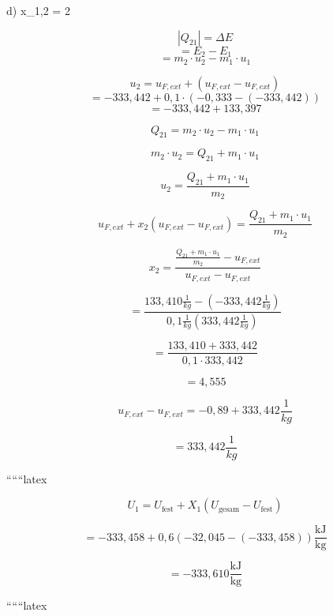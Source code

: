 d) \quad x_{1,2} = 2

\[
|Q_{21}| = \Delta E
\]
\[
= E_2 - E_1
\]
\[
= m_2 \cdot u_2 - m_1 \cdot u_1
\]

\[
u_2 = u_{F, ext} + \left( u_{F, ext} - u_{F, ext} \right)
\]
\[
= -333,442 + 0,1 \cdot (-0,333 - (-333,442))
\]
\[
= -333,442 + 133,397
\]

\[
Q_{21} = m_2 \cdot u_2 - m_1 \cdot u_1
\]

\[
m_2 \cdot u_2 = Q_{21} + m_1 \cdot u_1
\]

\[
u_2 = \frac{Q_{21} + m_1 \cdot u_1}{m_2}
\]

\[
u_{F, ext} + x_2 \left( u_{F, ext} - u_{F, ext} \right) = \frac{Q_{21} + m_1 \cdot u_1}{m_2}
\]

\[
x_2 = \frac{\frac{Q_{21} + m_1 \cdot u_1}{m_2} - u_{F, ext}}{u_{F, ext} - u_{F, ext}}
\]

\[
= \frac{133,410 \frac{1}{kg} - (-333,442 \frac{1}{kg})}{0,1 \frac{1}{kg} (333,442 \frac{1}{kg})}
\]

\[
= \frac{133,410 + 333,442}{0,1 \cdot 333,442}
\]

\[
= 4,555
\]

\[
u_{F, ext} - u_{F, ext} = -0,89 + 333,442 \frac{1}{kg}
\]

\[
= 333,442 \frac{1}{kg}
\]

``````latex


\[
U_1 = U_{\text{fest}} + X_1 \left( U_{\text{gesam}} - U_{\text{fest}} \right)
\]

\[
= -333,458 + 0,6 \left( -32,045 - (-333,458) \right) \frac{\text{kJ}}{\text{kg}}
\]

\[
= -333,610 \frac{\text{kJ}}{\text{kg}}
\]

``````latex
